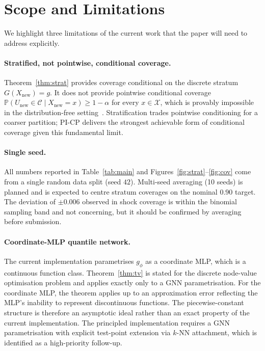 \documentclass[11pt]{article}
\theoremstyle{definition}
\theoremstyle{remark}
\newcommand{\PP}{\mathbb{P}}
\begin{document}
\section{Scope and Limitations}
\label{sec:limitations}

We highlight three limitations of the current work that the paper will need to address explicitly.

\paragraph{Stratified, not pointwise, conditional coverage.} Theorem~\ref{thm:strat} provides coverage conditional on the discrete stratum $G(X_{\text{new}}) = g$. It does not provide pointwise conditional coverage $\PP(U_{\text{new}} \in \mathcal{C} \mid X_{\text{new}} = x) \geq 1 - \alpha$ for every $x \in \mathcal{X}$, which is provably impossible in the distribution-free setting~\cite{barber2021limits}. Stratification trades pointwise conditioning for a coarser partition; PI-CP delivers the strongest achievable form of conditional coverage given this fundamental limit.

\paragraph{Single seed.} All numbers reported in Table~\ref{tab:main} and Figures~\ref{fig:strat}--\ref{fig:cov} come from a single random data split (seed $42$). Multi-seed averaging (10 seeds) is planned and is expected to centre stratum coverages on the nominal $0.90$ target. The deviation of $\pm 0.006$ observed in shock coverage is within the binomial sampling band and not concerning, but it should be confirmed by averaging before submission.

\paragraph{Coordinate-MLP quantile network.} The current implementation parametrises $g_\phi$ as a coordinate MLP, which is a continuous function class. Theorem~\ref{thm:tv} is stated for the discrete node-value optimisation problem and applies exactly only to a GNN parametrisation. For the coordinate MLP, the theorem applies up to an approximation error reflecting the MLP's inability to represent discontinuous functions. The piecewise-constant structure is therefore an asymptotic ideal rather than an exact property of the current implementation. The principled implementation requires a GNN parametrisation with explicit test-point extension via $k$-NN attachment, which is identified as a high-priority follow-up.
\end{document}
